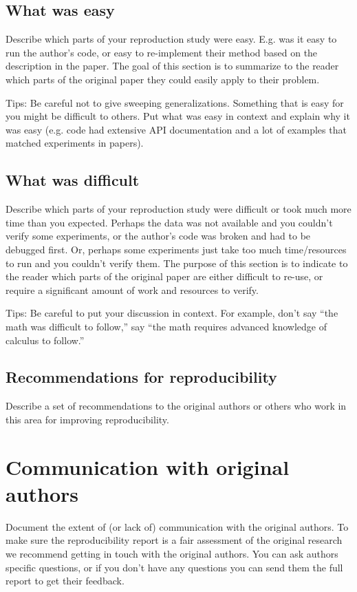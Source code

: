 \documentclass[11pt,a4paper]{article}
\begin{document}
\subsection{What was easy}
Describe which parts of your reproduction study were easy. E.g. was it easy to run the author's code, or easy to re-implement their method based on the description in the paper. The goal of this section is to summarize to the reader which parts of the original paper they could easily apply to their problem. 

Tips: Be careful not to give sweeping generalizations. Something that is easy for you might be difficult to others. Put what was easy in context and explain why it was easy (e.g. code had extensive API documentation and a lot of examples that matched experiments in papers). 

\subsection{What was difficult}
Describe which parts of your reproduction study were difficult or took much more time than you expected. Perhaps the data was not available and you couldn't verify some experiments, or the author's code was broken and had to be debugged first. Or, perhaps some experiments just take too much time/resources to run and you couldn't verify them. The purpose of this section is to indicate to the reader which parts of the original paper are either difficult to re-use, or require a significant amount of work and resources to verify. 

Tips: Be careful to put your discussion in context. For example, don't say ``the math was difficult to follow,'' say ``the math requires advanced knowledge of calculus to follow.'' 

\subsection{Recommendations for reproducibility}

Describe a set of recommendations to the original authors or others who work in this area for improving reproducibility.

\section{Communication with original authors}
Document the extent of (or lack of) communication with the original authors. To make sure the reproducibility report is a fair assessment of the original research we recommend getting in touch with the original authors. You can ask authors specific questions, or if you don't have any questions you can send them the full report to get their feedback.





\end{document}
